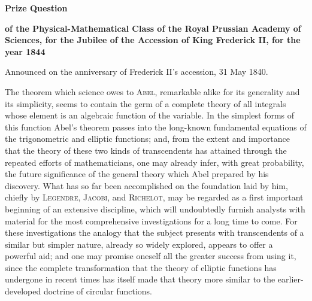 \documentclass[11pt]{article}
\newcommand{\scn}[1]{\textsc{#1}}
\begin{document}
\begin{center}
{\Large\bfseries Prize Question\par}
\vspace{0.3em}
{\large\bfseries of the Physical-Mathematical Class of the Royal Prussian Academy of Sciences, for the Jubilee of the Accession of King Frederick II, for the year 1844\par}
\vspace{0.8em}
\end{center}

\begin{center}Announced on the anniversary of Frederick II's accession, 31 May 1840.\end{center}

The theorem which science owes to \scn{Abel}, remarkable alike for its generality and its simplicity, seems to contain the germ of a complete theory of all integrals whose element is an algebraic function of the variable. In the simplest forms of this function Abel's theorem passes into the long-known fundamental equations of the trigonometric and elliptic functions; and, from the extent and importance that the theory of these two kinds of transcendents has attained through the repeated efforts of mathematicians, one may already infer, with great probability, the future significance of the general theory which Abel prepared by his discovery. What has so far been accomplished on the foundation laid by him, chiefly by \scn{Legendre}, \scn{Jacobi}, and \scn{Richelot}, may be regarded as a first important beginning of an extensive discipline, which will undoubtedly furnish analysts with material for the most comprehensive investigations for a long time to come. For these investigations the analogy that the subject presents with transcendents of a similar but simpler nature, already so widely explored, appears to offer a powerful aid; and one may promise oneself all the greater success from using it, since the complete transformation that the theory of elliptic functions has undergone in recent times has itself made that theory more similar to the earlier-developed doctrine of circular functions.
\end{document}
